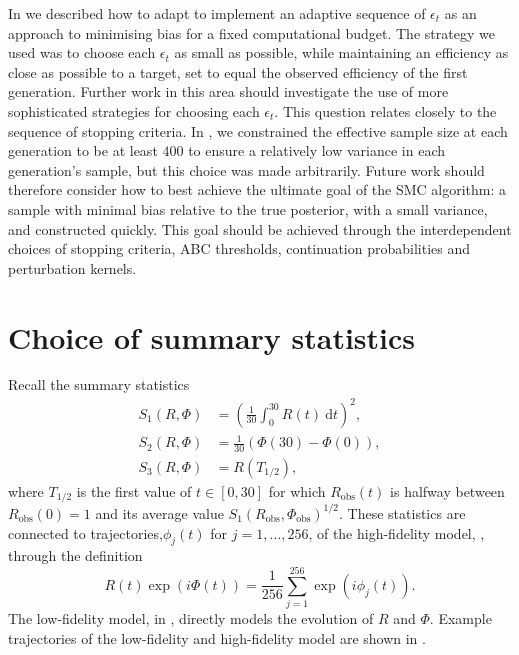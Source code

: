 \documentclass[12pt, onecolumn]{article}
\newcommand{\obs}[1]{#1_{\mathrm{obs}}}
\begin{document}
In  we described how to adapt  to implement an adaptive sequence of $\epsilon_t$ as an approach to minimising bias for a fixed computational budget.
The strategy we used was to choose each $\epsilon_t$ as small as possible, while maintaining an efficiency as close as possible to a target, set to equal the observed efficiency of the first generation.
Further work in this area should investigate the use of more sophisticated strategies for choosing each $\epsilon_t$.
This question relates closely to the sequence of stopping criteria.
In , we constrained the effective sample size at each generation to be at least $400$ to ensure a relatively low variance in each generation's sample, but this choice was made arbitrarily.
Future work should therefore consider how to best achieve the ultimate goal of the SMC algorithm: a sample with minimal bias relative to the true posterior, with a small variance, and constructed quickly.
This goal should be achieved through the interdependent choices of stopping criteria, ABC thresholds, continuation probabilities and perturbation kernels.




\clearpage
\pagebreak
\appendix

\renewcommand\thefigure{S.\arabic{figure}}
\setcounter{figure}{0}

\section{Choice of summary statistics}
\label{appendix:summary_statistics}

Recall the summary statistics
\begin{align*}
S_1(R, \Phi) &= \left( \frac{1}{30} \int_0^{30} R(t) ~\mathrm dt \right)^2, \\
S_2(R, \Phi) &= \frac{1}{30} \left( \Phi(30) - \Phi(0) \right), \\
S_3(R, \Phi) &= R \left( T_{1/2} \right),
\end{align*}
where $T_{1/2}$ is the first value of $t \in [0,30]$ for which $\obs R(t)$ is halfway between $\obs R(0)=1$ and its average value $S_1(\obs R, \obs \Phi)^{1/2}$.
These statistics are connected to trajectories,$\phi_j(t)$ for $j =1,\dots,256$, of the high-fidelity model, , through the definition
\[
R(t) \exp (i \Phi(t)) = \frac{1}{256} \sum_{j=1}^{256} \exp(i \phi_j(t)).
\]
The low-fidelity model, in , directly models the evolution of $R$ and $\Phi$.
Example trajectories of the low-fidelity and high-fidelity model are shown in .
\end{document}
